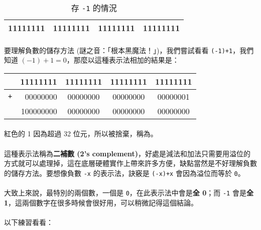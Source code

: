 \documentclass[12pt,a4paper,oneside]{article}
\begin{document}
\begin{CJK}{UTF8}{bkai}
\begin{table}[h!]
\centering
\begin{tabular}{|c|c|c|c|}
\hline
\textbf{1}1111111 & 11111111 & 11111111 & 11111111\\
\hline
\end{tabular}
\caption{存 \lstinline!-1! 的情況}
\label{basic:cpp:table:int:-1}
\end{table}

\paragraph{}要理解負數的儲存方法 (謎之音：「根本黑魔法！」)，我們嘗試看看 \lstinline!(-1)+1!，我們知道 $(-1)+1=0$，那麼以這種表示法相加的結果是：

\begin{table}[h!]
\centering
\begin{tabular}{|c|r|c|c|c|}
\hline
 & 11111111 & 11111111 & 11111111 & 11111111\\
\hline
\lstinline!+! & 00000000 & 00000000 & 00000000 & 00000001\\
\hline
\hline
 & {\color{red}1}00000000 & 00000000 & 00000000 & 00000000\\
\hline
\end{tabular}
\end{table}

\paragraph{}紅色的 {\color{red}1} 因為超過 32 位元，所以被捨棄，稱為。
\paragraph{}這種表示法稱為\textbf{二補數 (2's complement)}，好處是減法和加法只需要用溢位的方式就可以處理掉，這在底層硬體實作上帶來許多方便，缺點當然是不好理解負數的儲存方法。要想像負數 \lstinline!-x! 的表示法，訣竅是 \lstinline!(-x)+x! 會因為溢位而等於 \lstinline!0!。
\paragraph{}大致上來說，最特別的兩個數，一個是 \lstinline!0!，在此表示法中會是\textbf{全 0}；而 \lstinline!-1! 會是\textbf{全 1}，這兩個數字在很多時候會很好用，可以稍微記得這個結論。
\paragraph{}以下練習看看：


\end{CJK}
\end{document}
